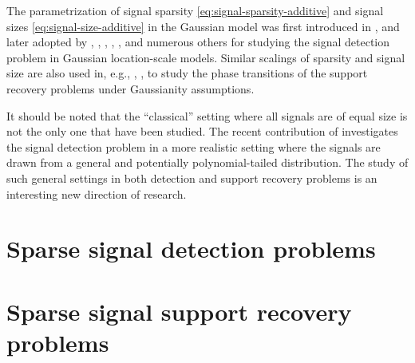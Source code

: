 The parametrization of signal sparsity \eqref{eq:signal-sparsity-additive} and signal sizes \eqref{eq:signal-size-additive} in the Gaussian model was first introduced in \citet{ingster1998minimax}, and later adopted by \cite{hall2010innovated}, \cite{cai2011optimal}, \cite{zhong2013tests}, \cite{cai2014optimal}, \cite{arias2017distribution1}, and numerous others for studying the signal detection problem in Gaussian location-scale models.
Similar scalings of sparsity and signal size are also used in, e.g., \cite{ji2012ups}, \cite{jin2014optimality}, \cite{butucea2018variable} to study the phase transitions of the support recovery problems under Gaussianity assumptions. 

It should be noted that the ``classical'' setting where all signals are of equal size is not the only one that have been studied. 
The recent contribution of \cite{li2020optimality} investigates the signal detection problem in a more realistic setting where the signals are drawn from a general and potentially polynomial-tailed distribution. 
The study of such general settings in both detection and support recovery problems is an interesting new direction of research.


\section{Sparse signal detection problems}
\label{sec:global-tests}


\section{Sparse signal support recovery problems}
\label{sec:additive-error-model-boundaries}



%




